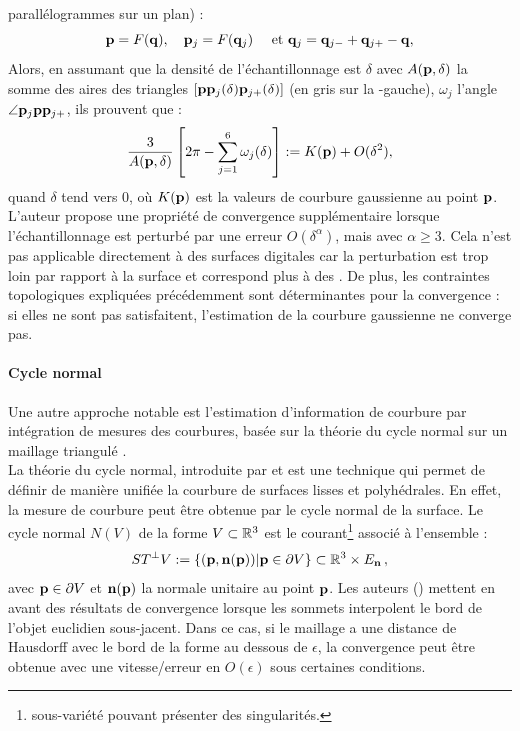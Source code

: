 parallélogrammes sur un plan) :
%
\begin{equation}
  \mathbf{p}=F(\mathbf{q}), \quad \mathbf{p}_j=F(\mathbf{q}_j) \quad \text{~et~} \mathbf{q}_j=\mathbf{q}_{j-} + \mathbf{q}_{j+} - \mathbf{q} ,
\end{equation}
%
Alors, en assumant que la densité de l’échantillonnage est $\delta$ avec $A(\mathbf{p}, \delta)$ la somme des aires des triangles
$[\mathbf{p}\mathbf{p}_j(\delta)\mathbf{p}_{j+}(\delta)]$ (en gris sur la
-gauche), $\omega_j$ l'angle $\angle
\mathbf{p}_j\mathbf{p}\mathbf{p}_{j+}$, ils prouvent que :
%
\begin{equation}
  \frac{3}{A(\mathbf{p},\delta)} \left[ 2\pi - \sum \limits^6_{j=1} \omega_j(\delta) \right] := K(\mathbf{p}) + O(\delta^2) ,
\end{equation}
%
quand $\delta$ tend vers $0$, où $K(\mathbf{p})$ est la valeurs de courbure
gaussienne au point $\mathbf{p}$.
%
\\
%
L'auteur propose une propriété de convergence supplémentaire lorsque
l'échantillonnage est perturbé par une erreur $O(\delta^\alpha)$, mais avec
$\alpha \ge 3$. Cela n'est pas applicable directement à des surfaces digitales car la perturbation est trop loin par rapport à la surface et correspond plus à des . De plus, les contraintes topologiques expliquées précédemment sont déterminantes pour la convergence : si elles ne sont pas satisfaitent, l'estimation de la courbure gaussienne ne converge pas.
%
\paragraph{Cycle normal}
%
Une autre approche notable est l'estimation d'information de courbure par
intégration de mesures des courbures, basée sur la théorie du cycle normal sur
un maillage triangulé \cite{CohenSteiner2003,CohenSteiner2006}.
%
\\
%
La théorie du cycle normal, introduite par  et
 est une technique qui permet de définir de manière
unifiée la courbure de surfaces lisses et polyhédrales. En effet, la mesure de
courbure peut être obtenue par le cycle normal de la surface. Le cycle normal
$N(V)$ de la forme $V \subset \mathbb{R}^3$ est le courant\footnote{sous-variété pouvant
présenter des singularités.} associé à l'ensemble :
%
\begin{equation}
  ST^\bot V := \{(\mathbf{p}, \mathbf{n}(\mathbf{p})) | \mathbf{p} \in \partial V\} \subset \mathbb{R}^3 \times E_{\mathbf{n}} \,,
\end{equation}
%
avec $\mathbf{p} \in \partial V$ et $\mathbf{n}(\mathbf{p})$ la normale unitaire au point
$\mathbf{p}$.
%
%
Les auteurs () mettent en avant des résultats de
convergence lorsque les sommets interpolent le bord de l'objet euclidien
sous-jacent. Dans ce cas, si le maillage a une distance de Hausdorff avec le
bord de la forme au dessous de $\epsilon$, la convergence peut être obtenue avec
une vitesse/erreur en $O(\epsilon)$ sous certaines conditions.
%
